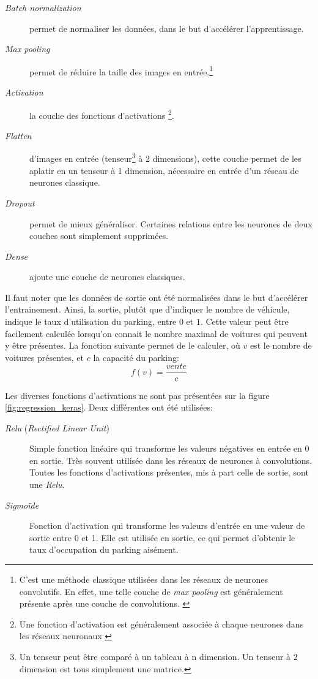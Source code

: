 \begin{description}
    \item[\textit{Batch normalization}] permet de normaliser les données, dans le but d'accélérer l'apprentissage.
    \item[\textit{Max pooling}] permet de réduire la taille des images en entrée.\footnote{C'est une méthode classique utilisées dans les réseaux de neurones convolutifs. En effet, une telle couche de \textit{max pooling} est généralement présente après une couche de convolutions. \autocite{wiki:CNN}} 
    \item[\textit{Activation}] la couche des fonctions d'activations \footnote{Une fonction d'activation est généralement associée à chaque neurones dans les réseaux neuronaux \autocite{wiki:NN}}. 
    \item[\textit{Flatten}] d'images en entrée (tenseur\footnote{Un tenseur peut être comparé à un tableau à n dimension. Un tenseur à 2 dimension est tous simplement une matrice. } à 2 dimensions), cette couche permet de les aplatir en un tenseur à 1 dimension, nécessaire en entrée d'un réseau de neurones classique.
    \item[\textit{Dropout}] permet de mieux généraliser. Certaines relations entre les neurones de deux couches sont simplement supprimées.
    \item[\textit{Dense}] ajoute une couche de neurones classiques. 
\end{description}

Il faut noter que les données de sortie ont été normalisées dans le but d'accélérer l'entrainement. Ainsi, la sortie, plutôt que d'indiquer le nombre de véhicule, indique le taux d'utilisation du parking, entre $0$ et $1$. Cette valeur peut être facilement calculée lorsqu'on connait le nombre maximal de voitures qui peuvent y être présentes. La fonction suivante permet de le calculer, où $v$ est le nombre de voitures présentes, et $c$ la capacité du parking:
\[
    f(v) = \frac{vente}{c}
\]

Les diverses fonctions d'activations ne sont pas présentées sur la figure \ref{fig:regression_keras}. Deux différentes ont été utilisées:

\begin{description}
    \item[\textit{Relu} (\textit{Rectified Linear Unit})] Simple fonction linéaire qui transforme les valeurs négatives en entrée en $0$ en sortie. Très souvent utilisée dans les réseaux de neurones à convolutions. Toutes les fonctions d'activations présentes, mis à part celle de sortie, sont une \textit{Relu}.
    \item[\textit{Sigmoïde}] Fonction d'activation qui transforme les valeurs d'entrée en une valeur de sortie entre 0 et 1. Elle est utilisée en sortie, ce qui permet d'obtenir le taux d'occupation du parking aisément.
\end{description}

